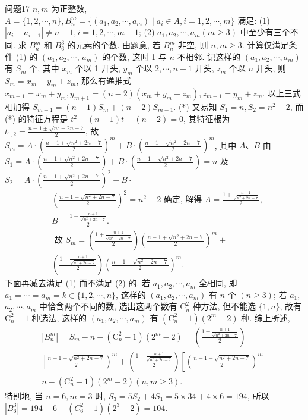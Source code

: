 问题17 $n, m$ 为正整数, $A=\{1,2, \cdots, n\}, B_n^m=\{\left(a_1, a_2, \cdots, a_m\right) \mid a_i \in A, i=1,2, \cdots, m\}$ 满足:
(1) $\left|a_i-a_{i+1}\right| \neq n-1, i=1,2, \cdots, m-1$;
(2) $a_1, a_2, \cdots, a_m(m \geqslant 3)$ 中至少有三个不同.
求 $B_n^m$ 和 $B_6^3$ 的元素的个数.
由题意, 若 $B_n^m$ 非空, 则 $n, m \geqslant 3$. 计算仅满足条件 (1) 的 $\left(a_1, a_2, \cdots\right.$, $\left.a_m\right)$ 的个数, 这时 1 与 $n$ 不相邻.
记这样的 $\left(a_1, a_2, \cdots, a_m\right)$ 有 $S_m$ 个, 其中 $x_m$ 个以 1 开头, $y_m$ 个以 $2, \cdots, n-1$ 开头, $z_m$ 个以 $n$ 开头, 则 $S_m=x_m+y_m+z_m$, 那么有递推式 $x_{m+1}=x_m+y_m, y_{m+1}=(n-2)\left(x_m+y_m+z_m\right), z_{m+1}=y_m+z_m$. 以上三式相加得 $S_{m+1}=(n-1) S_m+(n-2) S_{m-1}$. (*)
又易知 $S_1=n, S_2=n^2-2$, 而 (*) 的特征方程是 $t^2-(n-1) t-(n-2)=0$, 其特征根为 $t_{1,2}=\frac{n-1 \pm \sqrt{n^2+2 n-7}}{2}$, 故 $S_m=A \cdot\left(\frac{n-1+\sqrt{n^2+2 n-7}}{2}\right)^m+ B \cdot\left(\frac{n-1-\sqrt{n^2+2 n-7}}{2}\right)^m$, 其中 $A 、 B$ 由 $S_1=A \cdot\left(\frac{n-1+\sqrt{n^2+2 n-7}}{2}\right)+ B \cdot\left(\frac{n-1-\sqrt{n^2+2 n-7}}{2}\right)=n$ 及 $S_2=A \cdot\left(\frac{n-1+\sqrt{n^2+2 n-7}}{2}\right)^2+B \cdot$
$$
\begin{aligned}
& \left(\frac{n-1-\sqrt{n^2+2 n-7}}{2}\right)^2=n^2-2 \text { 确定, 解得 } A=\frac{1+\frac{n+1}{\sqrt{n^2+2 n-7}}}{2}, \\
& B=\frac{1-\frac{n+1}{\sqrt{n^2+2 n-7}}}{2} . \\
& \text { 故 } S_m=\left(\frac{1+\frac{n+1}{\sqrt{n^2+2 n-7}}}{2}\right)\left(\frac{n-1+\sqrt{n^2+2 n-7}}{2}\right)^m+ \\
& \left(\frac{1-\frac{n+1}{\sqrt{n^2+2 n-7}}}{2}\right)\left(\frac{n-1-\sqrt{n^2+2 n-7}}{2}\right)^m .
\end{aligned}
$$
下面再减去满足 (1) 而不满足 (2) 的.
若 $a_1, a_2, \cdots, a_m$ 全相同, 即 $a_1= \cdots=a_m=k \in\{1,2, \cdots, n\}$, 这样的 $\left(a_1, a_2, \cdots, a_m\right)$ 有 $n$ 个 $(n \geqslant 3)$; 若 $a_1$, $a_2, \cdots, a_m$ 中恰含两个不同的数, 选出这两个数有 $\mathrm{C}_n^2$ 种方法, 但不能选 $\{1, n\}$, 故有 $\mathrm{C}_n^2-1$ 种选法, 这样的 $\left(a_1, a_2, \cdots, a_m\right)$ 有 $\left(\mathrm{C}_n^2-1\right)\left(2^m-2\right)$ 种.
综上所述,
$$
\begin{aligned}
& \left|B_n^m\right|=S_m-n-\left(\mathrm{C}_n^2-1\right)\left(2^m-2\right)=\left(\frac{1+\frac{n+1}{\sqrt{n^2+2 n-7}}}{2}\right) \\
& {\left[\frac{n-1+\sqrt{n^2+2 n-7}}{2}\right)^m+\left(\frac{1-\frac{n+1}{\sqrt{n^2+2 n-7}}}{2}\right)\left[\left(\frac{n-1-\sqrt{n^2+2 n-7}}{2}\right)^m-\right.} \\
& n-\left(\mathrm{C}_n^2-1\right)\left(2^m-2\right)(n, m \geqslant 3) .
\end{aligned}
$$
特别地, 当 $n=6, m=3$ 时, $S_3=5 S_2+4 S_1=5 \times 34+4 \times 6=194$, 所以 $\left|B_6^3\right|=194-6-\left(C_6^2-1\right)\left(2^3-2\right)=104$.



